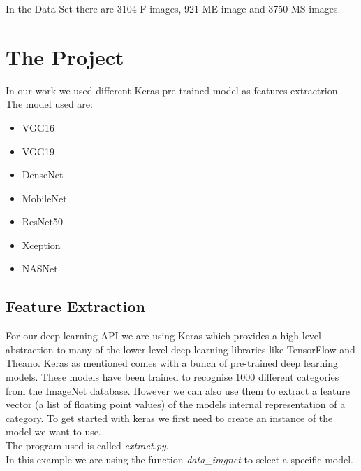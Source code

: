 \documentclass[12pt]{article} %
\begin{document}
\begin{figure}[H] %
 \end{figure}

In the Data Set there are 3104 F images, 921 ME image and 3750 MS images.

\newpage
\section{The Project}
In our work we used different Keras pre-trained model as features extractrion.\\
The model used are:
\begin{itemize}
\item VGG16
\item VGG19
\item DenseNet
\item MobileNet
\item ResNet50
\item Xception
\item NASNet
\end{itemize}

\subsection {Feature Extraction}
For our deep learning API we are using Keras which provides a high level abstraction to many of the lower level deep learning libraries like TensorFlow and Theano.
Keras as mentioned comes with a bunch of pre-trained deep learning models. These models have been trained to recognise 1000 different categories from the ImageNet database. 
However we can also use them to extract a feature vector (a list of floating point values) of the models internal representation of a category.
To get started with keras we first need to create an instance of the model we want to use.\\
The program used is called \textit{extract.py}.\\
 In this example we are using the function \textit{data\_imgnet} to select a specific model.
\end{document}
